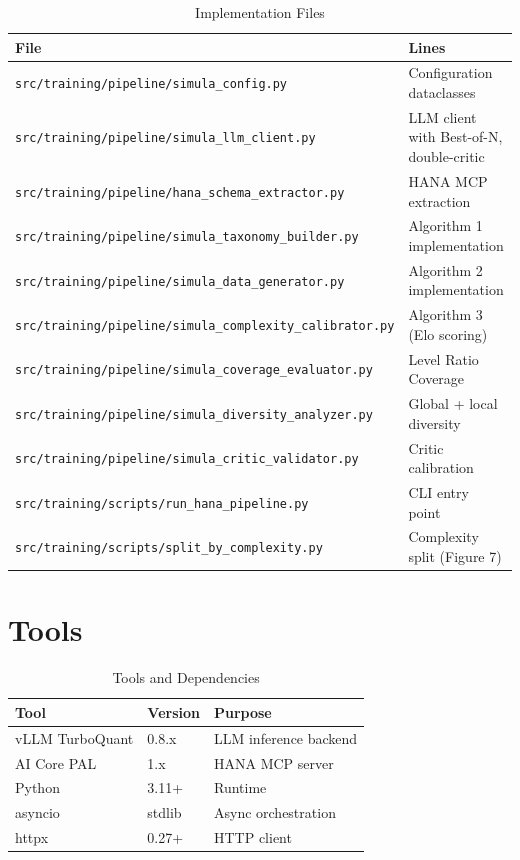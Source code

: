 \begin{table}[H]
\centering
\caption{Implementation Files}
\begin{tabularx}{\textwidth}{lX}
\toprule
\textbf{File} & \textbf{Lines} \\
\midrule
\texttt{src/training/pipeline/simula\_config.py} & Configuration dataclasses \\
\texttt{src/training/pipeline/simula\_llm\_client.py} & LLM client with Best-of-N, double-critic \\
\texttt{src/training/pipeline/hana\_schema\_extractor.py} & HANA MCP extraction \\
\texttt{src/training/pipeline/simula\_taxonomy\_builder.py} & Algorithm 1 implementation \\
\texttt{src/training/pipeline/simula\_data\_generator.py} & Algorithm 2 implementation \\
\texttt{src/training/pipeline/simula\_complexity\_calibrator.py} & Algorithm 3 (Elo scoring) \\
\texttt{src/training/pipeline/simula\_coverage\_evaluator.py} & Level Ratio Coverage \\
\texttt{src/training/pipeline/simula\_diversity\_analyzer.py} & Global + local diversity \\
\texttt{src/training/pipeline/simula\_critic\_validator.py} & Critic calibration \\
\texttt{src/training/scripts/run\_hana\_pipeline.py} & CLI entry point \\
\texttt{src/training/scripts/split\_by\_complexity.py} & Complexity split (Figure 7) \\
\bottomrule
\end{tabularx}
\end{table}

\section{Tools}

\begin{table}[H]
\centering
\caption{Tools and Dependencies}
\begin{tabular}{lll}
\toprule
\textbf{Tool} & \textbf{Version} & \textbf{Purpose} \\
\midrule
vLLM TurboQuant & 0.8.x & LLM inference backend \\
AI Core PAL & 1.x & HANA MCP server \\
Python & 3.11+ & Runtime \\
asyncio & stdlib & Async orchestration \\
httpx & 0.27+ & HTTP client \\
\bottomrule
\end{tabular}
\end{table}

